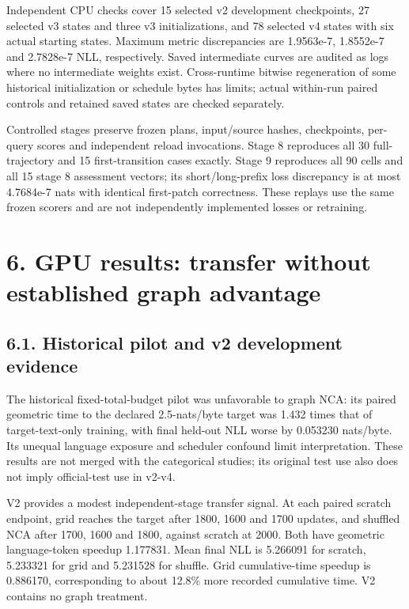 \documentclass[11pt,a4paper]{article}
\begin{document}
Independent CPU checks cover 15 selected v2 development checkpoints, 27 selected v3 states and three v3 initializations, and 78 selected v4 states with six actual starting states. Maximum metric discrepancies are 1.9563e-7, 1.8552e-7 and 2.7828e-7 NLL, respectively. Saved intermediate curves are audited as logs where no intermediate weights exist. Cross-runtime bitwise regeneration of some historical initialization or schedule bytes has limits; actual within-run paired controls and retained saved states are checked separately.

Controlled stages preserve frozen plans, input/\allowbreak{}source hashes, checkpoints, per-query scores and independent reload invocations. Stage 8 reproduces all 30 full-trajectory and 15 first-transition cases exactly. Stage 9 reproduces all 90 cells and all 15 stage 8 assessment vectors; its short/\allowbreak{}long-prefix loss discrepancy is at most 4.7684e-7 nats with identical first-patch correctness. These replays use the same frozen scorers and are not independently implemented losses or retraining.

\section*{6. GPU results: transfer without established graph advantage}
\subsection*{6.1. Historical pilot and v2 development evidence}
The historical fixed-total-budget pilot was unfavorable to graph NCA: its paired geometric time to the declared 2.5-nats/\allowbreak{}byte target was 1.432 times that of target-text-only training, with final held-out NLL worse by 0.053230 nats/\allowbreak{}byte. Its unequal language exposure and scheduler confound limit interpretation. These results are not merged with the categorical studies; its original test use also does not imply official-test use in v2-v4.

V2 provides a modest independent-stage transfer signal. At each paired scratch endpoint, grid reaches the target after 1800, 1600 and 1700 updates, and shuffled NCA after 1700, 1600 and 1800, against scratch at 2000. Both have geometric language-token speedup 1.177831. Mean final NLL is 5.266091 for scratch, 5.233321 for grid and 5.231528 for shuffle. Grid cumulative-time speedup is 0.886170, corresponding to about 12.8\% more recorded cumulative time. V2 contains no graph treatment.
\end{document}
